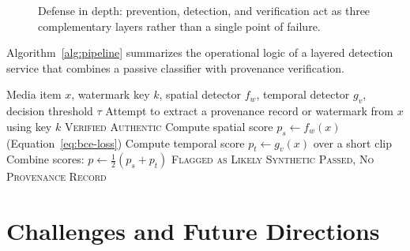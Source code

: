 \documentclass[a4paper,12pt]{article}
\begin{document}
\begin{figure}[H]
    \centering
    \caption{Defense in depth: prevention, detection, and verification act as three complementary layers rather than a single point of failure.}
    \label{fig:defense-in-depth}
\end{figure}

Algorithm~\ref{alg:pipeline} summarizes the operational logic of a layered detection service that combines a passive classifier with provenance verification.

\begin{algorithm}[H]
\caption{Layered Screening of an Uploaded Media Item}
\label{alg:pipeline}
\begin{algorithmic}[1]
\Require Media item $x$, watermark key $k$, spatial detector $f_w$, temporal detector $g_v$, decision threshold $\tau$
\State Attempt to extract a provenance record or watermark from $x$ using key $k$
    \State \Return \textsc{Verified Authentic}
\Else
    \State Compute spatial score $p_s \gets f_w(x)$ (Equation~\ref{eq:bce-loss})
    \State Compute temporal score $p_t \gets g_v(x)$ over a short clip
    \State Combine scores: $p \gets \tfrac{1}{2}(p_s + p_t)$
        \State \Return \textsc{Flagged as Likely Synthetic}
    \Else
        \State \Return \textsc{Passed, No Provenance Record}
    \EndIf
\EndIf
\end{algorithmic}
\end{algorithm}


\section{Challenges and Future Directions}
\label{sec:challenges}
\end{document}
